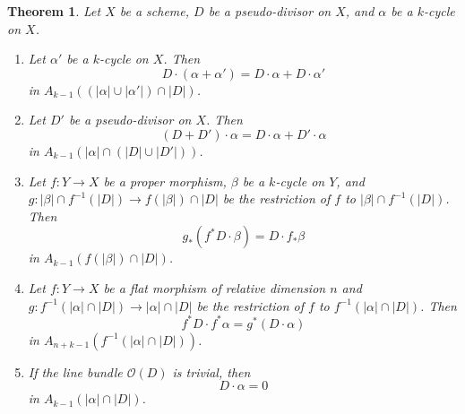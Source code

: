 \documentclass[leqno, openany]{memoir}
\newtheorem{thm}{Theorem}[section]
\theoremstyle{definition}
\theoremstyle{remark}
\theoremstyle{plain}
\theoremstyle{definition}
\theoremstyle{remark}
\newcommand{\msc}[1]{\mathscr{#1}}
\begin{document}
\begin{thm} \label{properties}
Let $X$ be a scheme, $D$ be a pseudo-divisor on $X$, and $\alpha$ be a $k$-cycle on $X$.
\begin{enumerate}[label=(\alph*)]
\item Let $\alpha'$ be a $k$-cycle on $X$. Then \[ D \cdot (\alpha + \alpha') = D \cdot \alpha + D \cdot \alpha' \] in $A_{k-1} ((|\alpha| \cup |\alpha'|) \cap |D|)$.
\item Let $D'$ be a pseudo-divisor on $X$. Then \[ (D + D') \cdot \alpha = D \cdot \alpha + D' \cdot \alpha \] in $A_{k-1}(|\alpha| \cap (|D| \cup |D'|))$.
\item Let $f\colon Y \to X$ be a proper morphism, $\beta$ be a $k$-cycle on $Y$, and $g\colon |\beta| \cap f^{-1}(|D|) \to f(|\beta|) \cap |D|$ be the restriction of $f$ to $|\beta| \cap f^{-1}(|D|)$. Then \[ g_* (f^* D \cdot \beta) = D \cdot f_* \beta \] in $A_{k-1}(f(|\beta|) \cap |D|)$.
\item Let $f\colon Y \to X$ be a flat morphism of relative dimension $n$ and $g\colon f^{-1}(|\alpha| \cap |D|) \to |\alpha| \cap |D|$ be the restriction of $f$ to $f^{-1}(|\alpha| \cap |D|)$. Then \[ f^* D \cdot f^* \alpha = g^* (D \cdot \alpha) \] in $A_{n+k-1}(f^{-1}(|\alpha| \cap |D|))$.
\item If the line bundle $\msc{O}(D)$ is trivial, then \[ D \cdot \alpha = 0 \] in $A_{k-1}(|\alpha| \cap |D|)$.
\end{enumerate}
\end{thm}
\end{document}
